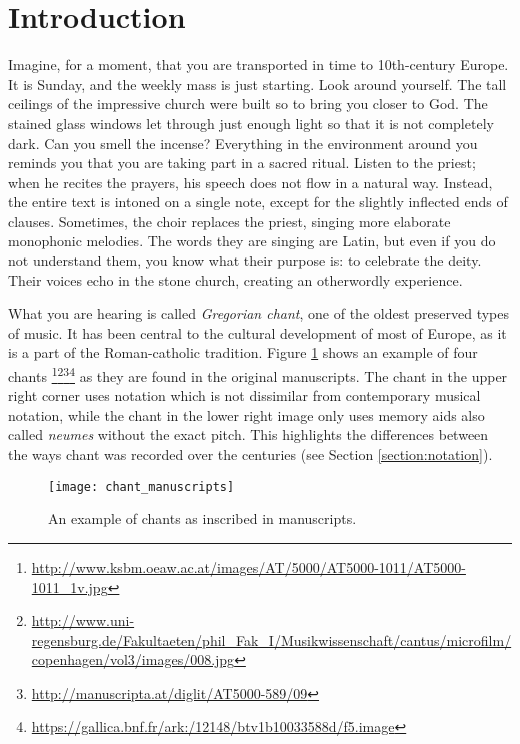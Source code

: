 \chapter*{Introduction}

Imagine, for a moment, that you are transported in time to 10th-century Europe. It is Sunday, and the weekly mass is just
starting. Look around yourself. The tall ceilings of the impressive church were built so to bring you closer to God. The stained glass windows
let through just enough light so that it is not completely dark. Can you smell the incense? Everything in the environment around
you reminds you that you are taking part in a sacred ritual. Listen to the priest; when he recites the prayers, his speech does not 
flow in a natural way. Instead, the entire text is intoned on a single note, except for the slightly inflected ends of clauses. 
Sometimes, the choir replaces the priest, singing more elaborate monophonic melodies. The words they are singing are Latin, but even 
if you do not understand them, you know what their purpose is: to celebrate the deity. Their voices echo in the stone church, creating an
otherwordly experience.

What you are hearing is called \emph{Gregorian chant}, one of the oldest preserved types of music. It has been central to the cultural development
of most of Europe, as it is a part of the Roman-catholic tradition. Figure \ref{fig:chant_manuscripts} shows an example of four chants
\footnote{\url{http://www.ksbm.oeaw.ac.at/images/AT/5000/AT5000-1011/AT5000-1011\_1v.jpg}}\footnote{\url{http://www.uni-regensburg.de/Fakultaeten/phil\_Fak\_I/Musikwissenschaft/cantus/microfilm/copenhagen/vol3/images/008.jpg}}\footnote{\url{http://manuscripta.at/diglit/AT5000-589/09}}\footnote{\url{https://gallica.bnf.fr/ark:/12148/btv1b10033588d/f5.image}} as they are found in
the original manuscripts. The chant in the upper right corner uses notation which is not dissimilar from contemporary musical notation,
while the chant in the lower right image only uses memory aids also called \emph{neumes} without the exact pitch. This highlights the differences
between the ways chant was recorded over the centuries (see Section \ref{section:notation}).

\begin{figure}[h]
\centering
\texttt{[image: chant\_manuscripts]}
\caption{An example of chants as inscribed in manuscripts.}
\label{fig:chant_manuscripts}
\end{figure}

